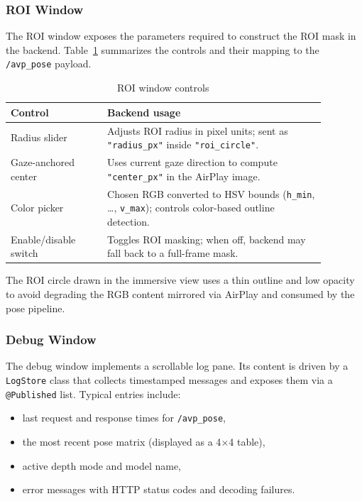 \subsubsection{ROI Window}

The ROI window exposes the parameters required to construct the ROI mask in the backend. Table~\ref{tab:roi-window-controls-dev} summarizes the controls and their mapping to the \texttt{/avp\_pose} payload.

\begin{table}[H]
    \centering
    \caption{ROI window controls}
    \label{tab:roi-window-controls-dev}
    \begin{tabular}{p{0.27\linewidth}p{0.61\linewidth}}
        \toprule
        \textbf{Control} & \textbf{Backend usage} \\
        \midrule
        Radius slider &
        Adjusts ROI radius in pixel units; sent as \texttt{"radius\_px"} inside \texttt{"roi\_circle"}. \\
        Gaze-anchored center &
        Uses current gaze direction to compute \texttt{"center\_px"} in the AirPlay image. \\
        Color picker &
        Chosen RGB converted to HSV bounds (\texttt{h\_min}, \dots, \texttt{v\_max}); controls color-based outline detection. \\
        Enable/disable switch &
        Toggles ROI masking; when off, backend may fall back to a full-frame mask. \\
        \bottomrule
    \end{tabular}
\end{table}

The ROI circle drawn in the immersive view uses a thin outline and low opacity to avoid degrading the RGB content mirrored via AirPlay and consumed by the pose pipeline.

\subsubsection{Debug Window}

The debug window implements a scrollable log pane. Its content is driven by a \texttt{LogStore} class that collects timestamped messages and exposes them via a \texttt{@Published} list. Typical entries include:

\begin{itemize}
    \item last request and response times for \texttt{/avp\_pose},
    \item the most recent pose matrix (displayed as a 4$\times$4 table),
    \item active depth mode and model name,
    \item error messages with HTTP status codes and decoding failures.
\end{itemize}

